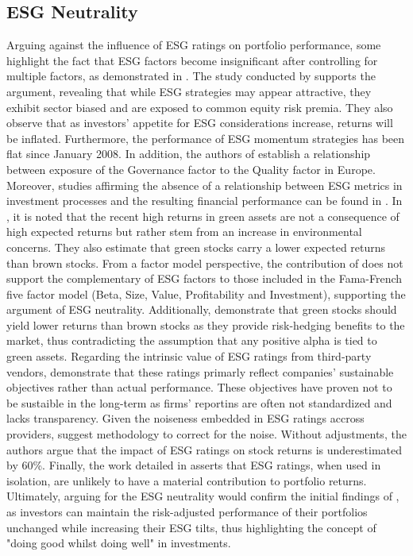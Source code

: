 \documentclass[11pt,a4paper]{article}
\begin{document}
\subsection{ESG Neutrality}

Arguing against the influence of ESG ratings on portfolio performance, some highlight the fact that ESG factors become insignificant after controlling for multiple factors, as demonstrated in . 
The study conducted by  supports the argument, revealing that while ESG strategies may appear attractive, they exhibit sector biased and are exposed to common equity risk premia. They also observe that as investors' appetite for ESG considerations increase, returns will be inflated. Furthermore, the performance of ESG momentum strategies has been flat since January 2008. 
In addition, the authors of  establish a relationship between exposure of the Governance factor to the Quality factor in Europe. 
Moreover, studies affirming the absence of a relationship between ESG metrics in investment processes and the resulting financial performance can be found in . 
In , it is noted that the recent high returns in green assets are not a consequence of high expected returns but rather stem from an increase in environmental concerns. They also estimate that green stocks carry a lower expected returns than brown stocks.
From a factor model perspective, the contribution of  does not support the complementary of ESG factors to those included in the Fama-French five factor model (Beta, Size, Value, Profitability and Investment), supporting the argument of ESG neutrality. 
Additionally,  demonstrate that green stocks should yield lower returns than brown stocks as they provide risk-hedging benefits to the market, thus contradicting the assumption that any positive alpha is tied to green assets.
Regarding the intrinsic value of ESG ratings from third-party vendors,  demonstrate that these ratings primarly reflect companies' sustainable objectives rather than actual performance. These objectives have proven not to be sustaible in the long-term as firms' reportins are often not standardized and lacks transparency.
Given the noiseness embedded in ESG ratings accross providers,  suggest methodology to correct for the noise. Without adjustments, the authors argue that the impact of ESG ratings on stock returns is underestimated by 60\%. 
Finally, the work detailed in  asserts that ESG ratings, when used in isolation, are unlikely to have a material contribution to portfolio returns.
Ultimately, arguing for the ESG neutrality would confirm the initial findings of , as investors can maintain the risk-adjusted performance of their portfolios unchanged while increasing their ESG tilts, thus highlighting the concept of "doing good whilst doing well" in investments. 
\end{document}
